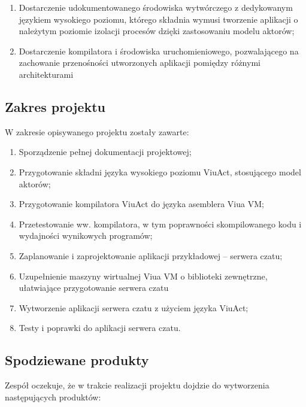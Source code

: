 \documentclass[11pt,oneside,a4paper,titlepage,onecolumn]{article}
\begin{document}
\begin{enumerate}
	\item Dostarczenie udokumentowanego środowiska wytwórczego z dedykowanym językiem wysokiego poziomu, którego składnia wymusi tworzenie aplikacji o należytym poziomie izolacji procesów dzięki zastosowaniu modelu aktorów;
	\item Dostarczenie kompilatora i środowiska uruchomieniowego, pozwalającego na zachowanie przenośności utworzonych aplikacji pomiędzy różnymi architekturami
\end{enumerate}
    
\subsection{Zakres projektu}

W zakresie opisywanego projektu zostały zawarte:

\begin{enumerate}
	\item Sporządzenie pełnej dokumentacji projektowej;
    \item Przygotowanie składni języka wysokiego poziomu ViuAct, stosującego model aktorów;
    \item Przygotowanie kompilatora ViuAct do języka asemblera Viua VM;
    \item Przetestowanie ww. kompilatora, w tym poprawności skompilowanego kodu i wydajności wynikowych programów;
    \item Zaplanowanie i zaprojektowanie aplikacji przykładowej – serwera czatu;
    \item Uzupełnienie maszyny wirtualnej Viua VM o biblioteki zewnętrzne, ułatwiające przygotowanie serwera czatu
    \item Wytworzenie aplikacji serwera czatu z użyciem języka ViuAct;
    \item Testy i poprawki do aplikacji serwera czatu.
\end{enumerate}

\subsection{Spodziewane produkty}

Zespół oczekuje, że w trakcie realizacji projektu dojdzie do wytworzenia następujących produktów:
\end{document}
